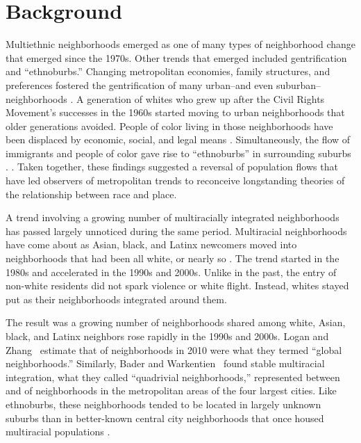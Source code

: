 \documentclass{baderart}
\newcommand{\TK}[1][]{\strong{TK #1}}
\begin{document}
\section{Background}\label{background}
Multiethnic neighborhoods emerged as one of many types of neighborhood change that emerged since the 1970s. Other trends that emerged included gentrification and ``ethnoburbs.'' Changing metropolitan economies, family structures, and preferences fostered the gentrification of many urban--and even suburban--neighborhoods \citep{rose_rethinking_1984, slater_gentrification_2004, lung-amam_trespassers?:_2017}. A generation of whites who grew up after the Civil Rights Movement's successes in the 1960s started moving to urban neighborhoods that older generations avoided. People of color living in those neighborhoods have been displaced by economic, social, and legal means \citep{freeman_there_2006, hyra_back---city_2014, hyra_race_2017}. Simultaneously, the flow of immigrants and people of color gave rise to ``ethnoburbs'' in surrounding suburbs  \citep{li_anatomy_1998}. \TK[Add description]. Taken together, these findings suggested a reversal of population flows that have led observers of metropolitan trends to reconceive longstanding theories of the relationship between race and place. 

A trend involving a growing number of multiracially integrated neighborhoods has passed largely unnoticed during the same period. Multiracial neighborhoods have come about as Asian, black, and Latinx newcomers moved into neighborhoods that had been all white, or nearly so \citep{logan_global_2010, bader_fragmented_2016} . The trend started in the 1980s and accelerated in the 1990s and 2000s. Unlike in the past, the entry of non-white residents did not spark violence or white flight. Instead, whites stayed put as their neighborhoods integrated around them. 

The result was a growing number of neighborhoods shared among white, Asian, black, and Latinx neighbors rose rapidly in the 1990s and 2000s. Logan and Zhang~\citeyearpar{logan_global_2011} estimate that \TK[\%] of neighborhoods in 2010 were what they termed ``global neighborhoods.'' Similarly, Bader and Warkentien~\citeyearpar{bader_fragmented_2016} found stable multiracial integration, what they called ``quadrivial neighborhoods,'' represented between \TK[\%] and \TK[\%] of neighborhoods in the metropolitan areas of the four largest cities. Like ethnoburbs, these neighborhoods tended to be located in largely unknown suburbs than in better-known central city neighborhoods that once housed multiracial populations \citep{bader_fragmented_2016, parisi_remaking_2019}. 
\end{document}
